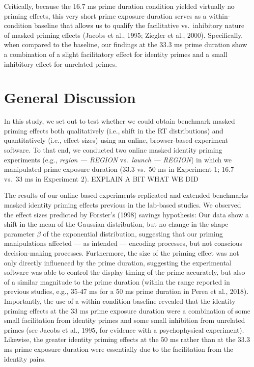 \documentclass[
  english,
  man,floatsintext]{apa6}
\begin{document}
Critically, because the 16.7 ms prime duration condition yielded virtually no priming effects, this very short prime exposure duration serves as a within-condition baseline that allows us to qualify the facilitative vs.~inhibitory nature of masked priming effects (Jacobs et al., 1995; Ziegler et al., 2000). Specifically, when compared to the baseline, our findings at the 33.3 ms prime duration show a combination of a slight facilitatory effect for identity primes and a small inhibitory effect for unrelated primes.

\hypertarget{general-discussion}{%
\section{General Discussion}\label{general-discussion}}

In this study, we set out to test whether we could obtain benchmark masked priming effects both qualitatively (i.e., shift in the RT distributions) and quantitatively (i.e., effect sizes) using an online, browser-based experiment software. To that end, we conducted two online masked identity priming experiments (e.g., \emph{region --- REGION} vs.~\emph{launch --- REGION}) in which we manipulated prime exposure duration (33.3 vs.~50 ms in Experiment 1; 16.7 vs.~33 ms in Experiment 2). \color{red} EXPLAIN A BIT WHAT WE DID \color{black}

The results of our online-based experiments replicated and extended benchmarks masked identity priming effects previous in the lab-based studies. We observed the effect sizes predicted by Forster's (1998) savings hypothesis: Our data show a shift in the mean of the Gaussian distribution, but no change in the shape parameter \(\beta\) of the exponential distribution, suggesting that our priming manipulations affected --- as intended --- encoding processes, but not conscious decision-making processes. Furthermore, the size of the priming effect was not only directly influenced by the prime duration, suggesting the experimental software was able to control the display timing of the prime accurately, but also of a similar magnitude to the prime duration (within the range reported in previous studies, e.g., 35-47 ms for a 50 ms prime duration in Perea et al., 2018). Importantly, the use of a within-condition baseline revealed that the identity priming effects at the 33 ms prime exposure duration were a combination of some small facilitation from identity primes and some small inhibition from unrelated primes (see Jacobs et al., 1995, for evidence with a psychophysical experiment). Likewise, the greater identity priming effects at the 50 ms rather than at the 33.3 ms prime exposure duration were essentially due to the facilitation from the identity pairs.
\end{document}
